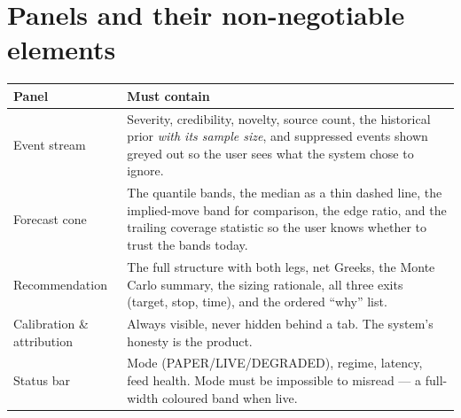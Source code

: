 \begin{center}
\end{center}

\section{Panels and their non-negotiable elements}

\begin{longtable}{@{}p{3.4cm}p{11.2cm}@{}}
\toprule
\textbf{Panel} & \textbf{Must contain}\\
\midrule
Event stream & Severity, credibility, novelty, source count, the historical prior
\emph{with its sample size}, and suppressed events shown greyed out so the user
sees what the system chose to ignore.\\
Forecast cone & The quantile bands, the median as a thin dashed line, the
implied-move band for comparison, the edge ratio, and the trailing coverage
statistic so the user knows whether to trust the bands today.\\
Recommendation & The full structure with both legs, net Greeks, the Monte Carlo
summary, the sizing rationale, all three exits (target, stop, time), and the
ordered ``why'' list.\\
Calibration \& attribution & Always visible, never hidden behind a tab. The
system's honesty is the product.\\
Status bar & Mode (PAPER/LIVE/DEGRADED), regime, latency, feed health. Mode must
be impossible to misread --- a full-width coloured band when live.\\
\bottomrule
\end{longtable}

